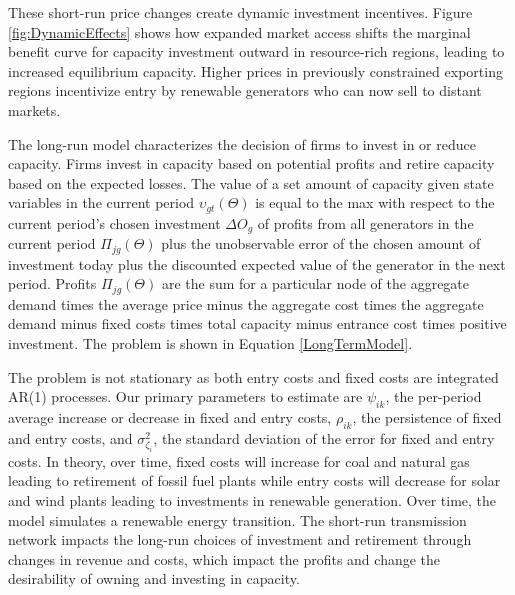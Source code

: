\documentclass[12pt]{article}
\begin{document}
These short-run price changes create dynamic investment incentives. Figure \ref{fig:DynamicEffects} shows how expanded market access shifts the marginal benefit curve for capacity investment outward in resource-rich regions, leading to increased equilibrium capacity. Higher prices in previously constrained exporting regions incentivize entry by renewable generators who can now sell to distant markets.

The long-run model characterizes the decision of firms to invest in or reduce capacity. Firms invest in capacity based on potential profits and retire capacity based on the expected losses. The value of a set amount of capacity given state variables in the current period $\upsilon_{gt}(\Theta)$ is equal to the max with respect to the current period's chosen investment $\Delta O_{g}$ of profits from all generators in the current period $\Pi_{jg}(\Theta)$ plus the unobservable error of the chosen amount of investment today plus the discounted expected value of the generator in the next period. Profits $\Pi_{jg}(\Theta)$ are the sum for a particular node of the aggregate demand times the average price minus the aggregate cost times the aggregate demand minus fixed costs times total capacity minus entrance cost times positive investment. The problem is shown in Equation \ref{LongTermModel}.

The problem is not stationary as both entry costs and fixed costs are integrated AR(1) processes. Our primary parameters to estimate are $\psi_{ik}$, the per-period average increase or decrease in fixed and entry costs, $\rho_{ik}$, the persistence of fixed and entry costs, and $\sigma^2_{\zeta_i}$, the standard deviation of the error for fixed and entry costs. In theory, over time, fixed costs will increase for coal and natural gas leading to retirement of fossil fuel plants while entry costs will decrease for solar and wind plants leading to investments in renewable generation. Over time, the model simulates a renewable energy transition. The short-run transmission network impacts the long-run choices of investment and retirement through changes in revenue and costs, which impact the profits and change the desirability of owning and investing in capacity.
\end{document}
